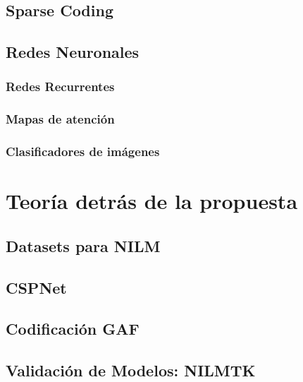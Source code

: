 \subsection{Sparse Coding}


\subsection{Redes Neuronales}
\subsubsection{Redes Recurrentes}
\subsubsection{Mapas de atención}
\subsubsection{Clasificadores de imágenes}


\section{Teoría detrás de la propuesta}
\subsection{Datasets para NILM}
\subsection{CSPNet}     
\subsection{Codificación GAF} 
\subsection{Validación de Modelos: NILMTK}  


